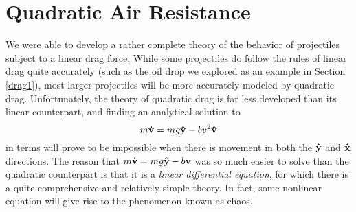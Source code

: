 

\section{Quadratic Air Resistance}
We were able to develop a rather complete theory of the behavior of projectiles subject to a linear drag force. While some projectiles do follow the rules of linear drag quite accurately (such as the oil drop we explored as an example in Section \ref{drag1}), most larger projectiles will be more accurately modeled by quadratic drag. Unfortunately, the theory of quadratic drag is far less developed than its linear counterpart, and finding an analytical solution to
\[ m\mathbf{\dot v} = mg\mathbf{\hat{y}} - bv^2\mathbf{\hat v} \]
in terms will prove to be impossible when there is movement in both the $\mathbf{\hat{y}}$ and $\mathbf{\hat{x}}$ directions. The reason that $m\mathbf{\dot v} = mg\mathbf{\hat{y}} - b\mathbf{v}$ was so much easier to solve than the quadratic counterpart is that it is a \textit{linear differential equation}, for which there is a quite comprehensive and relatively simple theory. In fact, some nonlinear equation will give rise to the phenomenon known as chaos. 
